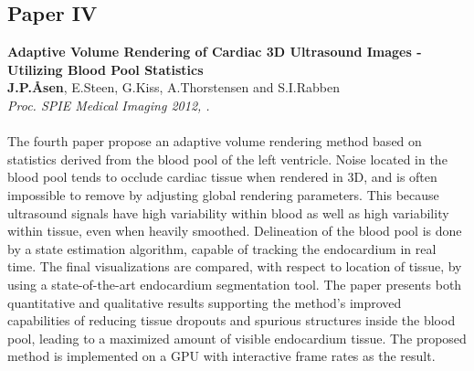 \subsection{Paper IV}
\textbf{Adaptive Volume Rendering of Cardiac 3D Ultrasound Images - Utilizing Blood Pool Statistics}\\
\textbf{J.\:P.\:\AA{}sen}, E.\:Steen, G.\:Kiss, A.\:Thorstensen and S.\:I.\:Rabben\\
{\it Proc. SPIE Medical Imaging 2012, .}\\\\
The fourth paper propose an adaptive volume rendering method based on statistics derived from the blood pool of the left ventricle. Noise located in the blood pool tends to occlude cardiac tissue when rendered in 3D, and is often impossible to remove by adjusting global rendering parameters. This because ultrasound signals have high variability within blood as well as high variability within tissue, even when heavily smoothed. Delineation of the blood pool is done by a state estimation algorithm, capable of tracking the endocardium in real time. The final visualizations are compared, with respect to location of tissue, by using a state-of-the-art endocardium segmentation tool. The paper presents both quantitative and qualitative results supporting the method's improved capabilities of reducing tissue dropouts and spurious structures inside the blood pool, leading to a maximized amount of visible endocardium tissue. The proposed method is implemented on a GPU with interactive frame rates as the result. 

